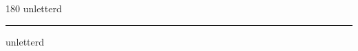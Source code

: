 
\begin{frame}
\begin{center}
\begin{turn}{180}
{\fontsize{2.5cm}{1em}\selectfont unletterd}
\end{turn}
\vspace{1em}\par  
\hrule
\vspace{1em}\par  
{\fontsize{2.5cm}{1em}\selectfont unletterd}
\end{center}
\end{frame}
